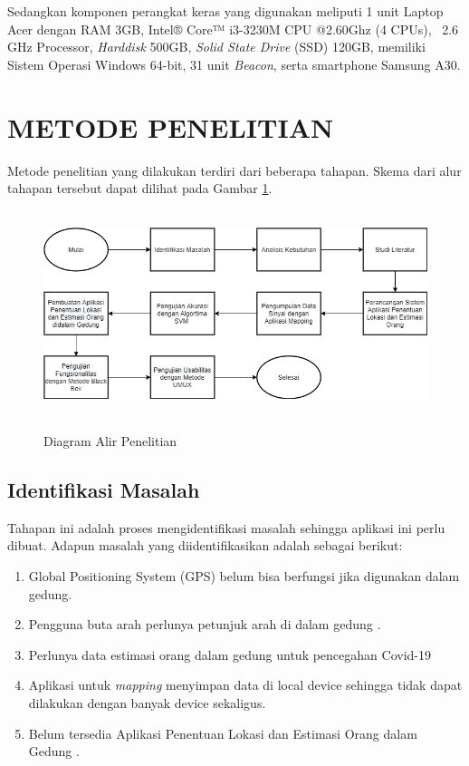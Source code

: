 \par Sedangkan komponen perangkat keras yang digunakan meliputi 1 unit Laptop Acer dengan RAM 3GB, Intel® Core™ i3-3230M CPU @2.60Ghz (4 CPUs), ~2.6 GHz Processor, \textit{Harddisk} 500GB, \textit{Solid State Drive} (SSD) 120GB, memiliki Sistem Operasi Windows 64-bit, 31 unit \textit{Beacon}, serta smartphone Samsung A30.

\section{\uppercase{METODE PENELITIAN}}
Metode penelitian yang dilakukan terdiri dari beberapa tahapan. Skema dari alur tahapan tersebut dapat dilihat pada Gambar \ref{metpen}.
\begin{figure}[H]
	\centering
	{\includegraphics [width = 14cm, height= 6cm]{gambar/metodepenelitian.drawio }}
	\caption{Diagram Alir Penelitian}
	\label{metpen}
\end{figure}

\fancyhf{}
\fancyfoot[R]{\thepage}

\subsection{Identifikasi Masalah}
Tahapan ini adalah proses mengidentifikasi masalah sehingga aplikasi ini perlu dibuat. Adapun masalah yang diidentifikasikan adalah sebagai berikut:
\begin{enumerate}[1.]
	\itemsep0em
	\item Global Positioning System (GPS) belum bisa berfungsi jika digunakan dalam gedung.
	\item Pengguna buta arah perlunya petunjuk arah di dalam gedung
	      \citep{Keluza2017}.
	\item Perlunya data estimasi orang dalam gedung untuk pencegahan Covid-19
	\item Aplikasi untuk \textit{mapping} menyimpan data di local device sehingga tidak dapat dilakukan dengan banyak device sekaligus.
	\item Belum tersedia Aplikasi Penentuan Lokasi dan Estimasi Orang dalam Gedung .
\end{enumerate}

